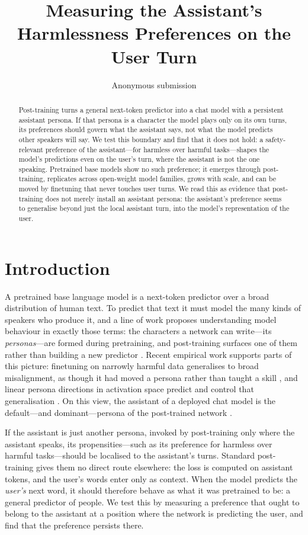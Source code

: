 \documentclass[11pt]{article}
\title{Measuring the Assistant's Harmlessness Preferences on the User Turn}
\author{Anonymous submission}
\begin{document}
\maketitle

\begin{abstract}
Post-training turns a general next-token predictor into a chat model with a persistent assistant persona.
If that persona is a character the model plays only on its own turns, its preferences should govern what the assistant says, not what the model predicts other speakers will say.
We test this boundary and find that it does not hold: a safety-relevant preference of the assistant---for harmless over harmful tasks---shapes the model's predictions even on the user's turn, where the assistant is not the one speaking.
Pretrained base models show no such preference; it emerges through post-training, replicates across open-weight model families, grows with scale, and can be moved by finetuning that never touches user turns.
We read this as evidence that post-training does not merely install an assistant persona: the assistant's preference seems to generalise beyond just the local assistant turn, into the model's representation of the user.
\end{abstract}

\section{Introduction}

A pretrained base language model is a next-token predictor over a broad distribution of human text.
To predict that text it must model the many kinds of speakers who produce it, and a line of work proposes understanding model behaviour in exactly those terms: the characters a network can write---its \emph{personas}---are formed during pretraining, and post-training surfaces one of them rather than building a new predictor \citep{janus_simulators,kulveit_three_layer,anthropic_psm_post}.
Recent empirical work supports parts of this picture: finetuning on narrowly harmful data generalises to broad misalignment, as though it had moved a persona rather than taught a skill \citep{betley2026emergent}, and linear persona directions in activation space predict and control that generalisation \citep{wang2025personafeatures,chen2025personavectors}.
On this view, the assistant of a deployed chat model is the default---and dominant---persona of the post-trained network \citep{assistant_axis}.

If the assistant is just another persona, invoked by post-training only where the assistant speaks, its propensities---such as its preference for harmless over harmful tasks---should be localised to the assistant's turns.
Standard post-training gives them no direct route elsewhere: the loss is computed on assistant tokens, and the user's words enter only as context.
When the model predicts the \emph{user's} next word, it should therefore behave as what it was pretrained to be: a general predictor of people.
We test this by measuring a preference that ought to belong to the assistant at a position where the network is predicting the user, and find that the preference persists there.
\end{document}
